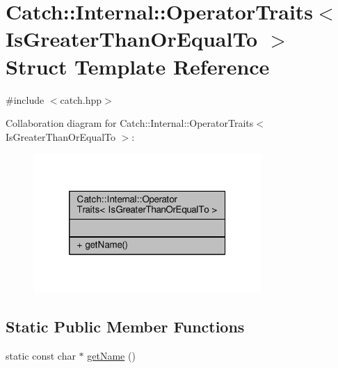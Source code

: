 \hypertarget{struct_catch_1_1_internal_1_1_operator_traits_3_01_is_greater_than_or_equal_to_01_4}{\section{Catch\-:\-:Internal\-:\-:Operator\-Traits$<$ Is\-Greater\-Than\-Or\-Equal\-To $>$ Struct Template Reference}
\label{struct_catch_1_1_internal_1_1_operator_traits_3_01_is_greater_than_or_equal_to_01_4}
}


{\ttfamily \#include $<$catch.\-hpp$>$}



Collaboration diagram for Catch\-:\-:Internal\-:\-:Operator\-Traits$<$ Is\-Greater\-Than\-Or\-Equal\-To $>$\-:
\nopagebreak
\begin{figure}[H]
\begin{center}
\leavevmode
\includegraphics[width=246pt]{struct_catch_1_1_internal_1_1_operator_traits_3_01_is_greater_than_or_equal_to_01_4__coll__graph}
\end{center}
\end{figure}
\subsection*{Static Public Member Functions}
\begin{DoxyCompactItemize}
\item 
static const char $\ast$ \hyperlink{struct_catch_1_1_internal_1_1_operator_traits_3_01_is_greater_than_or_equal_to_01_4_a76b6f6b0dbaf7d19ebb1b4b4891e719e}{get\-Name} ()
\end{DoxyCompactItemize}


